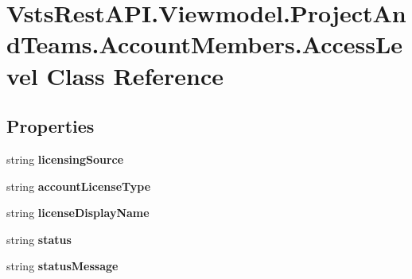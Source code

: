 \hypertarget{class_vsts_rest_a_p_i_1_1_viewmodel_1_1_project_and_teams_1_1_account_members_1_1_access_level}{}\section{Vsts\+Rest\+A\+P\+I.\+Viewmodel.\+Project\+And\+Teams.\+Account\+Members.\+Access\+Level Class Reference}
\label{class_vsts_rest_a_p_i_1_1_viewmodel_1_1_project_and_teams_1_1_account_members_1_1_access_level}
\subsection*{Properties}
\begin{DoxyCompactItemize}
\item 
\mbox{\label{class_vsts_rest_a_p_i_1_1_viewmodel_1_1_project_and_teams_1_1_account_members_1_1_access_level_ad2670b6be0a8c5c57bc6c03d305715ab}} 
string {\bfseries licensing\+Source}
\item 
\mbox{\label{class_vsts_rest_a_p_i_1_1_viewmodel_1_1_project_and_teams_1_1_account_members_1_1_access_level_a734b5bc139b7ff2853abebd2324efd94}} 
string {\bfseries account\+License\+Type}
\item 
\mbox{\label{class_vsts_rest_a_p_i_1_1_viewmodel_1_1_project_and_teams_1_1_account_members_1_1_access_level_ac84352bdf1bd74892f48c45e08043345}} 
string {\bfseries license\+Display\+Name}
\item 
\mbox{\label{class_vsts_rest_a_p_i_1_1_viewmodel_1_1_project_and_teams_1_1_account_members_1_1_access_level_a6b6973963c804ed16ad0f1c62e77bbed}} 
string {\bfseries status}
\item 
\mbox{\label{class_vsts_rest_a_p_i_1_1_viewmodel_1_1_project_and_teams_1_1_account_members_1_1_access_level_ae1cdf85b202e1e83d3caba81f1b2d97e}} 
string {\bfseries status\+Message}
\end{DoxyCompactItemize}


